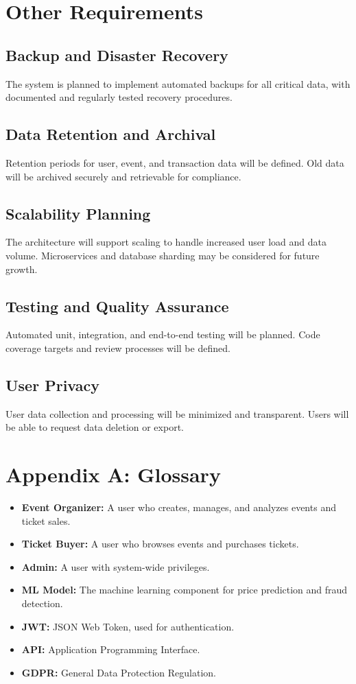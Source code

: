 \documentclass[11pt,a4paper]{article}
\begin{document}
\section{Other Requirements}

\subsection{Backup and Disaster Recovery}
The system is planned to implement automated backups for all critical data, with documented and regularly tested recovery procedures.

\subsection{Data Retention and Archival}
Retention periods for user, event, and transaction data will be defined. Old data will be archived securely and retrievable for compliance.

\subsection{Scalability Planning}
The architecture will support scaling to handle increased user load and data volume. Microservices and database sharding may be considered for future growth.

\subsection{Testing and Quality Assurance}
Automated unit, integration, and end-to-end testing will be planned. Code coverage targets and review processes will be defined.

\subsection{User Privacy}
User data collection and processing will be minimized and transparent. Users will be able to request data deletion or export.
\appendix

\section{Appendix A: Glossary}
\begin{itemize}
    \item \textbf{Event Organizer:} A user who creates, manages, and analyzes events and ticket sales.
    \item \textbf{Ticket Buyer:} A user who browses events and purchases tickets.
    \item \textbf{Admin:} A user with system-wide privileges.
    \item \textbf{ML Model:} The machine learning component for price prediction and fraud detection.
    \item \textbf{JWT:} JSON Web Token, used for authentication.
    \item \textbf{API:} Application Programming Interface.
    \item \textbf{GDPR:} General Data Protection Regulation.
\end{itemize}
\end{document}

